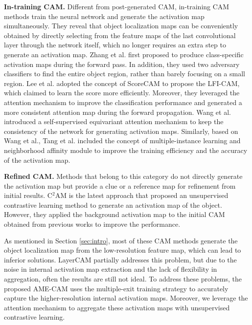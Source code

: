 \textbf{In-training CAM.} Different from post-generated CAM, in-training CAM methods \cite{wang2020self,lee2021lfi,zhang2018adversarial} train the neural network and generate the activation map simultaneously. They reveal that object localization maps can be conveniently obtained by directly selecting from the feature maps of the last convolutional layer through the network itself, which no longer requires an extra step to generate an activation map. 
Zhang et al. \cite{zhang2018adversarial} first proposed to produce class-specific activation maps during the forward pass. In addition, they used two adversary classifiers to find the entire object region, rather than barely focusing on a small region. 
Lee et al. \cite{lee2021lfi} adopted the concept of ScoreCAM to propose the LFI-CAM, which claimed to learn the score more efficiently. Moreover, they leveraged the attention mechanism to improve the classification performance and generated a more consistent attention map during the forward propagation.
Wang et al. \cite{wang2020self} introduced a self-supervised equivariant attention mechanism to keep the consistency of the network for generating activation maps. Similarly, based on Wang et al., Tang et al. \cite{tang2021m} included the concept of multiple-instance learning and neighborhood affinity module to improve the training efficiency and the accuracy of the activation map. 

\textbf{Refined CAM.} Methods \cite{li2022transcam,xie2022c2am} that belong to this category do not directly generate the activation map but provide a clue or a reference map for refinement from initial results.  C$^2$AM \cite{xie2022c2am} is the latest approach that proposed an unsupervised contrastive learning method to generate an activation map of the object. However, they applied the background activation map to the initial CAM obtained from previous works to improve the performance.


As mentioned in Section \ref{sec:intro}, most of these CAM methods generate the object localization map from the low-resolution feature map, which can lead to inferior solutions. LayerCAM partially addresses this problem, but due to the noise in internal activation map extraction and the lack of flexibility in aggregation, often the results are still not ideal. To address these problems, the proposed AME-CAM uses the multiple-exit training strategy to accurately capture the higher-resolution internal activation maps. Moreover, we leverage the attention mechanism to aggregate these activation maps with unsupervised contrastive learning.


